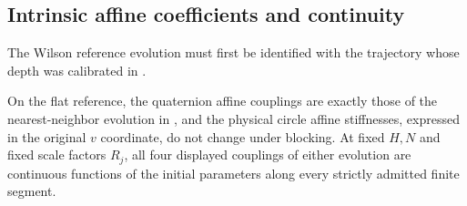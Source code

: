 \subsection{Intrinsic affine coefficients and continuity}

The Wilson reference evolution must first be identified with the
trajectory whose depth was calibrated in \cite{SharpO4}.

\begin{lemma}
\label{lem:cmp-continuity}
On the flat reference, the quaternion affine couplings are exactly those
of the nearest-neighbor evolution in \cite{SharpO4}, and the physical
circle affine stiffnesses, expressed in the original $v$ coordinate,
do not change under blocking.  At fixed $H,N$ and fixed scale factors
$R_j$, all four displayed couplings of either evolution are continuous
functions of the initial parameters along every strictly admitted finite
segment.
\end{lemma}

